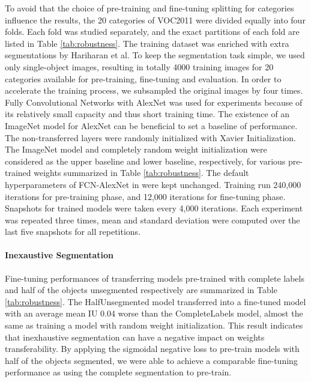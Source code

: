 To avoid that the choice of pre-training and fine-tuning splitting for categories influence the results, the 20 categories of VOC2011 were divided equally into four folds.
Each fold was studied separately, and the exact partitions of each fold are listed in Table \ref{tab:robustness}.
The training dataset was enriched with extra segmentations by Hariharan et al. \cite{hariharan2011semantic}
To keep the segmentation task simple, we used only single-object images, resulting in totally 4000 training images for 20 categories available for pre-training, fine-tuning and evaluation.
In order to accelerate the training process, we subsampled the original images by four times.
Fully Convolutional Networks with AlexNet was used for experiments because of its relatively small capacity and thus short training time.
The existence of an ImageNet model for AlexNet can be beneficial to set a baseline of performance.
The non-transferred layers were randomly initialized with Xavier Initialization.
The ImageNet model and completely random weight initialization were considered as the upper baseline and lower baseline, respectively, for various pre-trained weights summarized in Table \ref{tab:robustness}.
The default hyperparameters of FCN-AlexNet in  \cite{long2015fully} were kept unchanged.
Training run 240,000 iterations for pre-training phase, and 12,000 iterations for fine-tuning phase.
Snapshots for trained models were taken every 4,000 iterations.
Each experiment was repeated three times, mean and standard deviation were computed over the last five snapshots for all repetitions.




\paragraph{Inexaustive Segmentation}

Fine-tuning performances of transferring models pre-trained with complete labels and half of the objects unsegmented respectively are summarized in Table \ref{tab:robustness}.
The HalfUnsegmented model transferred into a fine-tuned model with an average mean IU 0.04 worse than the CompleteLabels model, almost the same as training a model with random weight initialization.
This result indicates that inexhaustive segmentation can have a negative impact on weights transferability.
By applying the sigmoidal negative loss to pre-train models with half of the objects segmented, we were able to achieve a comparable fine-tuning performance as using the complete segmentation to pre-train.

